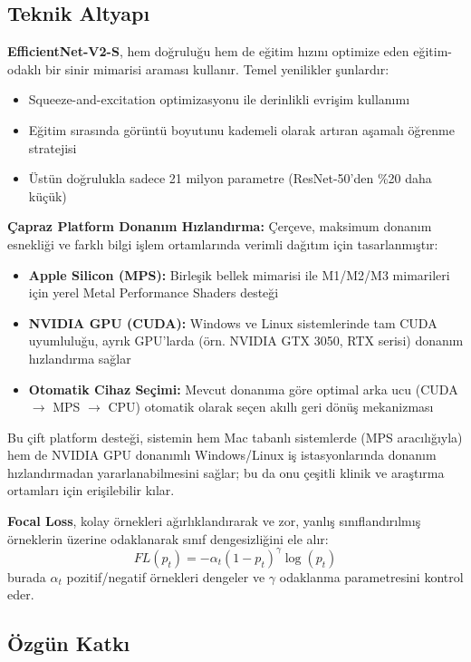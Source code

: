 \documentclass[12pt,a4paper]{article}
\begin{document}
\subsection{Teknik Altyapı}

\textbf{EfficientNet-V2-S}, hem doğruluğu hem de eğitim hızını optimize eden eğitim-odaklı bir sinir mimarisi araması kullanır. Temel yenilikler şunlardır:
\begin{itemize}
    \item Squeeze-and-excitation optimizasyonu ile derinlikli evrişim kullanımı
    \item Eğitim sırasında görüntü boyutunu kademeli olarak artıran aşamalı öğrenme stratejisi
    \item Üstün doğrulukla sadece 21 milyon parametre (ResNet-50'den \%20 daha küçük)
\end{itemize}

\textbf{Çapraz Platform Donanım Hızlandırma:} Çerçeve, maksimum donanım esnekliği ve farklı bilgi işlem ortamlarında verimli dağıtım için tasarlanmıştır:
\begin{itemize}
    \item \textbf{Apple Silicon (MPS):} Birleşik bellek mimarisi ile M1/M2/M3 mimarileri için yerel Metal Performance Shaders desteği
    \item \textbf{NVIDIA GPU (CUDA):} Windows ve Linux sistemlerinde tam CUDA uyumluluğu, ayrık GPU'larda (örn. NVIDIA GTX 3050, RTX serisi) donanım hızlandırma sağlar
    \item \textbf{Otomatik Cihaz Seçimi:} Mevcut donanıma göre optimal arka ucu (CUDA $\rightarrow$ MPS $\rightarrow$ CPU) otomatik olarak seçen akıllı geri dönüş mekanizması
\end{itemize}

Bu çift platform desteği, sistemin hem Mac tabanlı sistemlerde (MPS aracılığıyla) hem de NVIDIA GPU donanımlı Windows/Linux iş istasyonlarında donanım hızlandırmadan yararlanabilmesini sağlar; bu da onu çeşitli klinik ve araştırma ortamları için erişilebilir kılar.

\textbf{Focal Loss}, kolay örnekleri ağırlıklandırarak ve zor, yanlış sınıflandırılmış örneklerin üzerine odaklanarak sınıf dengesizliğini ele alır:
\begin{equation}
    FL(p_t) = -\alpha_t (1 - p_t)^\gamma \log(p_t)
\end{equation}
burada $\alpha_t$ pozitif/negatif örnekleri dengeler ve $\gamma$ odaklanma parametresini kontrol eder.

\subsection{Özgün Katkı}
\end{document}
